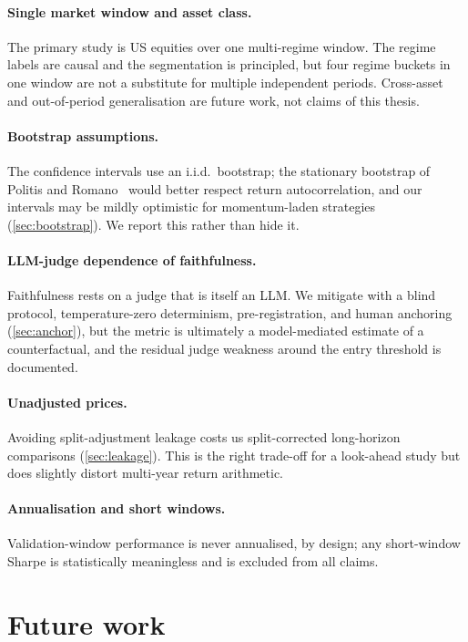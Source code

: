 \paragraph{Single market window and asset class.} The primary study is US equities over one
multi-regime window. The regime labels are causal and the segmentation is principled, but four
regime buckets in one window are not a substitute for multiple independent periods. Cross-asset
and out-of-period generalisation are future work, not claims of this thesis.

\paragraph{Bootstrap assumptions.} The confidence intervals use an i.i.d.\ bootstrap; the
stationary bootstrap of Politis and Romano~\cite{politis1994} would better respect return
autocorrelation, and our intervals may be mildly optimistic for momentum-laden strategies
(\cref{sec:bootstrap}). We report this rather than hide it.

\paragraph{LLM-judge dependence of faithfulness.} Faithfulness rests on a judge that is itself
an LLM. We mitigate with a blind protocol, temperature-zero determinism, pre-registration, and
human anchoring (\cref{sec:anchor}), but the metric is ultimately a model-mediated estimate of
a counterfactual, and the residual judge weakness around the entry threshold is documented.

\paragraph{Unadjusted prices.} Avoiding split-adjustment leakage costs us split-corrected
long-horizon comparisons (\cref{sec:leakage}). This is the right trade-off for a look-ahead
study but does slightly distort multi-year return arithmetic.

\paragraph{Annualisation and short windows.} Validation-window performance is never
annualised, by design; any short-window Sharpe is statistically meaningless and is excluded
from all claims.

\section{Future work}
\label{sec:future}

